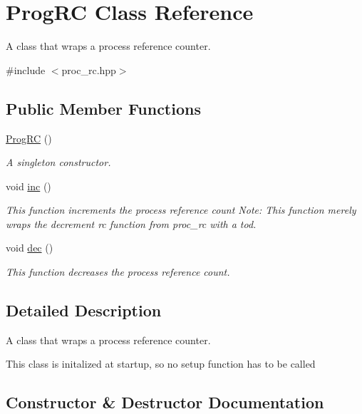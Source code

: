 \hypertarget{class_prog_r_c}{}\section{Prog\+RC Class Reference}
\label{class_prog_r_c}


A class that wraps a process reference counter.  




{\ttfamily \#include $<$proc\+\_\+rc.\+hpp$>$}

\subsection*{Public Member Functions}
\begin{DoxyCompactItemize}
\item 
\hyperlink{class_prog_r_c_a299eea3a12ad2db6979a8ed3ce3d5515}{Prog\+RC} ()
\begin{DoxyCompactList}\small\item\em A singleton constructor. \end{DoxyCompactList}\item 
void \hyperlink{class_prog_r_c_a60944b2ad72413fc2374c0681d273284}{inc} ()
\begin{DoxyCompactList}\small\item\em This function increments the process reference count Note\+: This function merely wraps the decrement rc function from proc\+\_\+rc with a tod. \end{DoxyCompactList}\item 
void \hyperlink{class_prog_r_c_a7d7ae8b170f94e145f62937072dd07f6}{dec} ()
\begin{DoxyCompactList}\small\item\em This function decreases the process reference count. \end{DoxyCompactList}\end{DoxyCompactItemize}


\subsection{Detailed Description}
A class that wraps a process reference counter. 

This class is initalized at startup, so no \textquotesingle{}setup\textquotesingle{} function has to be called 

\subsection{Constructor \& Destructor Documentation}
